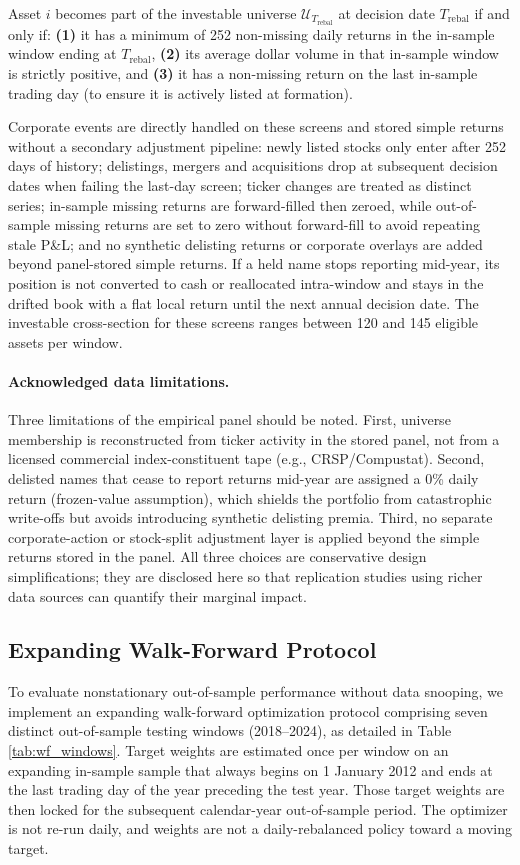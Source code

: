 \documentclass[11pt,a4paper]{article}
\begin{document}
Asset $i$ becomes part of the investable universe $\mathcal{U}_{T_{\text{rebal}}}$ at decision date $T_{\text{rebal}}$ if and only if: \textbf{(1)} it has a minimum of 252 non-missing daily returns in the in-sample window ending at $T_{\text{rebal}}$, \textbf{(2)} its average dollar volume in that in-sample window is strictly positive, and \textbf{(3)} it has a non-missing return on the last in-sample trading day (to ensure it is actively listed at formation).

Corporate events are directly handled on these screens and stored simple returns without a secondary adjustment pipeline: newly listed stocks only enter after 252 days of history; delistings, mergers and acquisitions drop at subsequent decision dates when failing the last-day screen; ticker changes are treated as distinct series; in-sample missing returns are forward-filled then zeroed, while out-of-sample missing returns are set to zero without forward-fill to avoid repeating stale P\&L; and no synthetic delisting returns or corporate overlays are added beyond panel-stored simple returns. If a held name stops reporting mid-year, its position is not converted to cash or reallocated intra-window and stays in the drifted book with a flat local return until the next annual decision date. The investable cross-section for these screens ranges between 120 and 145 eligible assets per window.

\paragraph{Acknowledged data limitations.}
Three limitations of the empirical panel should be noted. First, universe membership is reconstructed from ticker activity in the stored panel, not from a licensed commercial index-constituent tape (e.g., CRSP/Compustat). Second, delisted names that cease to report returns mid-year are assigned a 0\% daily return (frozen-value assumption), which shields the portfolio from catastrophic write-offs but avoids introducing synthetic delisting premia. Third, no separate corporate-action or stock-split adjustment layer is applied beyond the simple returns stored in the panel. All three choices are conservative design simplifications; they are disclosed here so that replication studies using richer data sources can quantify their marginal impact.

\subsection{Expanding Walk-Forward Protocol}
\label{sec:protocol}
To evaluate nonstationary out-of-sample performance without data snooping, we implement an expanding walk-forward optimization protocol comprising seven distinct out-of-sample testing windows (2018--2024), as detailed in Table \ref{tab:wf_windows}. Target weights are estimated once per window on an expanding in-sample sample that always begins on 1 January 2012 and ends at the last trading day of the year preceding the test year. Those target weights are then locked for the subsequent calendar-year out-of-sample period. The optimizer is not re-run daily, and weights are not a daily-rebalanced policy toward a moving target.
\end{document}
